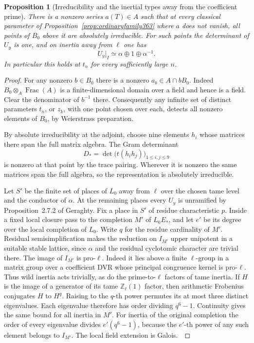 \documentclass[a4paper,11pt]{article}
\newtheorem{proposition}{Proposition}[section]
\theoremstyle{definition}
\theoremstyle{remark}
\newcommand{\ZZ}{\mathbb Z}\newcommand{\ord}{\operatorname{ord}}
\numberwithin{equation}{section}
\begin{document}
\begin{proposition}[Irreducibility and the inertial types away from the coefficient prime]
\label{prop:awaytype363}
There is a nonzero series \(a(T)\in A\) such that at every
classical parameter of Proposition~\ref{prop:ordinaryfamily363}
where \(a\) does not vanish, all points of \(B_0\) above it are
absolutely irreducible. For such points the determinant of
\(U_y\) is one, and on inertia away from \(\ell\) one has
\[
                    U_y|_{I}\simeq\alpha\oplus1\oplus\alpha^{-1}.
\]
In particular this holds at \(t_n\) for every sufficiently large \(n\).
\end{proposition}
\begin{proof}
For any nonzero \(b\in B_0\) there is a nonzero
\(a_b\in A\cap bB_0\). Indeed \(B_0\otimes_A\operatorname{Frac}(A)\)
is a finite-dimensional domain over a field and hence is a field.
Clear the denominator of \(b^{-1}\) there. Consequently any
infinite set of distinct parameters \(t_n\), or \(z_k\), with
one point chosen over each, detects all nonzero elements of
\(B_0\), by Weierstrass preparation.

By absolute irreducibility at the adjoint, choose nine elements
\(h_i\) whose matrices there span the full matrix algebra. The
Gram determinant
\[
                 D_*=\det\big(t(h_i h_j)\big)_{1\le i,j\le9}
\]
is nonzero at that point by the trace pairing. Wherever it is
nonzero the same matrices span the full algebra, so the
representation is absolutely irreducible.

Let \(S'\) be the finite set of places of \(L_0\) away from
\(\ell\) over the chosen tame level and the conductor of \(\alpha\).
At the remaining places every \(U_y\) is unramified by
Proposition~2.7.2 of Geraghty. Fix a place in \(S'\) of residue
characteristic \(p\). Inside a fixed local closure pass to the
completion \(M'\) of \(L_0E_*\), and let \(e'\) be its degree over
the local completion of \(L_0\). Write \(q\) for the residue
cardinality of \(M'\). Residual semisimplification makes the
reduction on \(I_{M'}\) upper unipotent in a suitable stable
lattice, since \(\alpha\) and the residual cyclotomic character
are trivial there. The image of \(I_{M'}\) is pro-\(\ell\).
Indeed it lies above a finite \(\ell\)-group in a matrix group
over a coefficient DVR whose principal congruence kernel is
pro-\(\ell\). Thus wild inertia acts trivially, as do the
prime-to-\(\ell\) factors of tame inertia. If \(H\) is the
image of a generator of its tame \(\ZZ_\ell(1)\) factor, then
arithmetic Frobenius conjugates \(H\) to \(H^q\). Raising to
the \(q\)-th power permutes its at most three distinct eigenvalues.
Each eigenvalue therefore has order dividing \(q^6-1\).
Continuity gives the same bound for all inertia in \(M'\).
For inertia of the original completion the order of every
eigenvalue divides \(e'(q^6-1)\), because the \(e'\)-th power
of any such element belongs to \(I_{M'}\). The local field
extension is Galois.~\cite{VII-V-geraghty363}


\end{proof}
\end{document}
